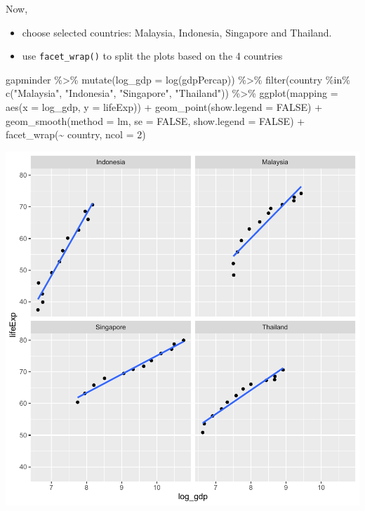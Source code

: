\documentclass[
]{book}
\makeatletter
\newenvironment{Shaded}{\begin{snugshade}}{\end{snugshade}}
\newcommand{\AttributeTok}[1]{\textcolor[rgb]{0.61,0.61,0.61}{#1}}
\newcommand{\ConstantTok}[1]{\textcolor[rgb]{0,0,0}{#1}}
\newcommand{\DecValTok}[1]{\textcolor[rgb]{0.06,0.06,0.06}{#1}}
\newcommand{\FunctionTok}[1]{\textcolor[rgb]{0,0,0}{#1}}
\newcommand{\NormalTok}[1]{#1}
\newcommand{\SpecialCharTok}[1]{\textcolor[rgb]{0,0,0}{#1}}
\newcommand{\StringTok}[1]{\textcolor[rgb]{0.5,0.5,0.5}{#1}}
\providecommand{\tightlist}{%
  \setlength{\itemsep}{0pt}\setlength{\parskip}{0pt}}
\newenvironment{kframe}{%
\medskip{}
\setlength{\fboxsep}{.8em}
 \def\at@end@of@kframe{}%
 \ifinner\ifhmode%
  \def\at@end@of@kframe{\end{minipage}}%
  \begin{minipage}{\columnwidth}%
 \fi\fi%
 \def\FrameCommand##1{\hskip\@totalleftmargin \hskip-\fboxsep
 \colorbox{shadecolor}{##1}\hskip-\fboxsep
     \hskip-\linewidth \hskip-\@totalleftmargin \hskip\columnwidth}%
 \MakeFramed {\advance\hsize-\width
   \@totalleftmargin\z@ \linewidth\hsize
   \@setminipage}}%
 {\par\unskip\endMakeFramed%
 \at@end@of@kframe}
\renewenvironment{Shaded}{\begin{kframe}}{\end{kframe}}
\makeatother
\begin{document}
Now,

\begin{itemize}
\tightlist
\item
  choose selected countries: Malaysia, Indonesia, Singapore and Thailand.
\item
  use \texttt{facet\_wrap()} to split the plots based on the 4 countries
\end{itemize}

\begin{Shaded}
\begin{Highlighting}[]
\NormalTok{gapminder }\SpecialCharTok{\%\textgreater{}\%} \FunctionTok{mutate}\NormalTok{(}\AttributeTok{log\_gdp =} \FunctionTok{log}\NormalTok{(gdpPercap)) }\SpecialCharTok{\%\textgreater{}\%}
  \FunctionTok{filter}\NormalTok{(country }\SpecialCharTok{\%in\%} \FunctionTok{c}\NormalTok{(}\StringTok{"Malaysia"}\NormalTok{, }\StringTok{"Indonesia"}\NormalTok{, }\StringTok{"Singapore"}\NormalTok{, }\StringTok{"Thailand"}\NormalTok{)) }\SpecialCharTok{\%\textgreater{}\%}
\FunctionTok{ggplot}\NormalTok{(}\AttributeTok{mapping =} \FunctionTok{aes}\NormalTok{(}\AttributeTok{x =}\NormalTok{ log\_gdp, }\AttributeTok{y =}\NormalTok{ lifeExp)) }\SpecialCharTok{+}
  \FunctionTok{geom\_point}\NormalTok{(}\AttributeTok{show.legend =} \ConstantTok{FALSE}\NormalTok{) }\SpecialCharTok{+}
  \FunctionTok{geom\_smooth}\NormalTok{(}\AttributeTok{method =}\NormalTok{ lm, }\AttributeTok{se =} \ConstantTok{FALSE}\NormalTok{, }\AttributeTok{show.legend =} \ConstantTok{FALSE}\NormalTok{) }\SpecialCharTok{+}
  \FunctionTok{facet\_wrap}\NormalTok{(}\SpecialCharTok{\textasciitilde{}}\NormalTok{ country, }\AttributeTok{ncol =} \DecValTok{2}\NormalTok{)}
\end{Highlighting}
\end{Shaded}

\begin{center}\includegraphics[width=0.7\linewidth,keepaspectratio]{Multivariable_Data_Analysis_files/figure-latex/unnamed-chunk-96-1} \end{center}
\end{document}
